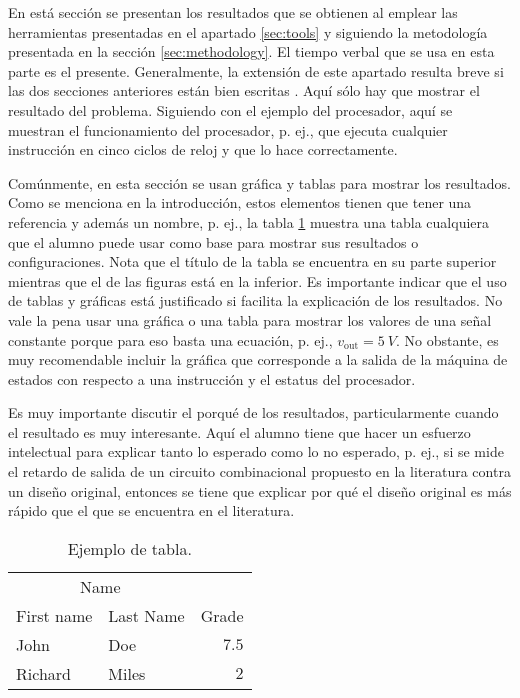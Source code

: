 \documentclass[11pt, twocolumn]{article}
\begin{document}
En está sección se presentan los resultados que se obtienen al emplear las herramientas presentadas en el apartado \ref{sec:tools} y siguiendo la metodología presentada en la sección \ref{sec:methodology}. El tiempo verbal que se usa en esta parte es el presente. Generalmente, la extensión de este apartado resulta breve si las dos secciones anteriores están bien escritas \cite{DaRo05}. Aquí sólo hay que mostrar el resultado del problema. Siguiendo con el ejemplo del procesador, aquí se muestran el funcionamiento del procesador, p. ej., que ejecuta cualquier instrucción en cinco ciclos de reloj y que lo hace correctamente.

Comúnmente, en esta sección se usan gráfica y tablas para mostrar los resultados. Como se menciona en la introducción, estos elementos tienen que tener una referencia y además un nombre, p. ej., la tabla \ref{tab:example} muestra una tabla cualquiera que el alumno puede usar como base para mostrar sus resultados o configuraciones. Nota que el título de la tabla se encuentra en su parte superior mientras que el de las figuras está en la inferior. Es importante indicar que el uso de tablas y gráficas está justificado si facilita la explicación de los resultados. No vale la pena usar una gráfica o una tabla para mostrar los valores de una señal constante porque para eso basta una ecuación, p. ej., $v_\mathrm{out} = \SI{5}{V}$. No obstante, es muy recomendable incluir la gráfica que corresponde a la salida de la máquina de estados con respecto a una instrucción y el estatus del procesador.

Es muy importante discutir el porqué de los resultados, particularmente cuando el resultado es muy interesante. Aquí el alumno tiene que hacer un esfuerzo intelectual para explicar tanto lo esperado como lo no esperado, p. ej., si se mide el retardo de salida de un circuito combinacional propuesto en la literatura contra un diseño original, entonces se tiene que explicar por qué el diseño original es más rápido que el que se encuentra en el literatura.

\begin{table}
   \centering
   \caption{Ejemplo de tabla.}
   \begin{tabular}{llr}
      \toprule
      \multicolumn{2}{c}{Name} \\
      \cmidrule(r){1-2} First name & Last Name & Grade \\ 
      \midrule John & Doe & $7.5$ \\
      Richard & Miles & $2$ \\
      \bottomrule
   \end{tabular}
   \label{tab:example}
\end{table}
\end{document}
